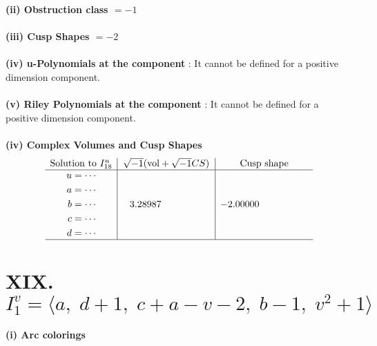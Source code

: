 \documentclass[1p]{elsarticle_modified}
\theoremstyle{definition}
\newcommand{\I}{\sqrt{-1}}
\begin{document}
\flushleft \textbf{(ii) Obstruction class $= -1$}\\~\\
\flushleft \textbf{(iii) Cusp Shapes $= -2$}\\~\\
\flushleft \textbf{(iv) u-Polynomials at the component} : It cannot be defined for a positive dimension component.\\~\\
\flushleft \textbf{(v) Riley Polynomials at the component} : It cannot be defined for a positive dimension component.\\~\\
\newpage\flushleft \textbf{(iv) Complex Volumes and Cusp Shapes}
$$\begin{array}{c|c|c} 
\text{Solution to }I^u_{18}& \I (\text{vol} + \sqrt{-1}CS) & \text{Cusp shape}\\
 \hline 
\begin{aligned}
u &= \cdots \\
a &= \cdots \\
b &= \cdots \\
c &= \cdots \\
d &= \cdots\end{aligned}
 & \phantom{-}3.28987\phantom{ +0.000000I} & -2.00000\phantom{ +0.000000I}\\
 \hline 
 \end{array}
$$\newpage\renewcommand{\arraystretch}{1}
\centering \section*{XIX. $I^v_{1}= \langle a,\;d+1,\;c+a- v-2,\;b-1,\;v^2+1 \rangle$}
\flushleft \textbf{(i) Arc colorings}\\
\end{document}
